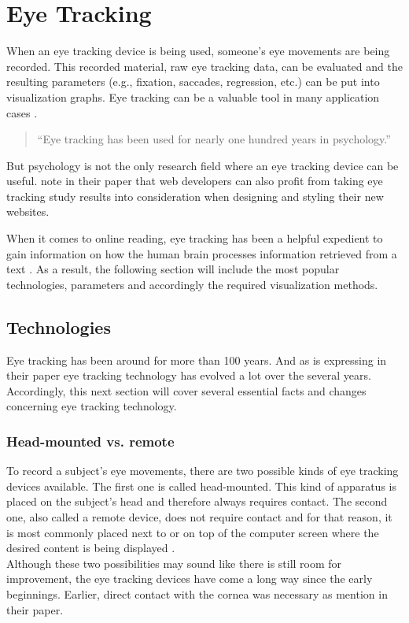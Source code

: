 \section{Eye Tracking}
\label{section:EyeTracking}
When an eye tracking device is being used, someone's eye movements are being recorded. This recorded material, raw eye tracking data, can be evaluated and the resulting parameters (e.g., fixation, saccades, regression, etc.) can be put into visualization graphs. Eye tracking can be a valuable tool in many application cases \autocite[]{goldberg2002eye, poole2006eye, beymer2007eye}.

\begin{quote}
``Eye tracking has been used for nearly one hundred years in psychology.''
\autocite[1]{schiessl2003eye}
\end{quote}

But psychology is not the only research field where an eye tracking device can be useful. \textcite[]{buscher2009you} note in their paper that web developers can also profit from taking eye tracking study results into consideration when designing and styling their new websites. 

When it comes to online reading, eye tracking has been a helpful expedient to gain information on how the human brain processes information retrieved from a text \autocite[]{schiessl2003eye}.
As a result, the following section will include the most popular technologies, parameters and accordingly the required visualization methods. 

\subsection{Technologies}
\label{subsection:Technologies}
Eye tracking has been around for more than 100 years. And as \textcite[]{poole2006eye} is expressing in their paper eye tracking technology has evolved a lot over the several years.
Accordingly, this next section will cover several essential facts and changes concerning eye tracking technology.

\subsubsection{Head-mounted vs. remote}
To record a subject's eye movements, there are two possible kinds of eye tracking devices available. The first one is called head-mounted. This kind of apparatus is placed on the subject's head and therefore always requires contact. 
The second one, also called a remote device, does not require contact and for that reason, it is most commonly placed next to or on top of the computer screen where the desired content is being displayed \autocite[]{jacob2003eye, schiessl2003eye}.\\
Although these two possibilities may sound like there is still room for improvement, the eye tracking devices have come a long way since the early beginnings. Earlier, direct contact with the cornea was necessary as \textcite[]{jacob2003eye} mention in their paper.

